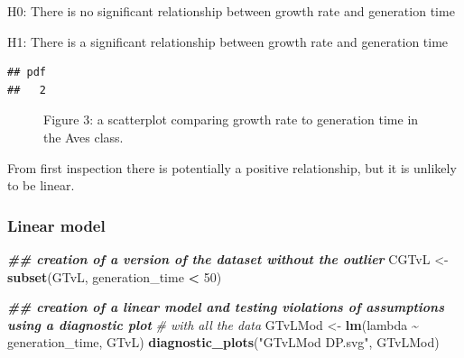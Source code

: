 \documentclass[
]{article}
\newenvironment{Shaded}{\begin{snugshade}}{\end{snugshade}}
\newcommand{\CommentTok}[1]{\textcolor[rgb]{0.56,0.35,0.01}{\textit{#1}}}
\newcommand{\ConstantTok}[1]{\textcolor[rgb]{0.56,0.35,0.01}{#1}}
\newcommand{\DecValTok}[1]{\textcolor[rgb]{0.00,0.00,0.81}{#1}}
\newcommand{\DocumentationTok}[1]{\textcolor[rgb]{0.56,0.35,0.01}{\textbf{\textit{#1}}}}
\newcommand{\FunctionTok}[1]{\textcolor[rgb]{0.13,0.29,0.53}{\textbf{#1}}}
\newcommand{\NormalTok}[1]{#1}
\newcommand{\OtherTok}[1]{\textcolor[rgb]{0.56,0.35,0.01}{#1}}
\newcommand{\SpecialCharTok}[1]{\textcolor[rgb]{0.81,0.36,0.00}{\textbf{#1}}}
\newcommand{\StringTok}[1]{\textcolor[rgb]{0.31,0.60,0.02}{#1}}
\begin{document}
H0: There is no significant relationship between growth rate and
generation time

H1: There is a significant relationship between growth rate and
generation time

\begin{Shaded}
\end{Shaded}

\begin{verbatim}
## pdf 
##   2
\end{verbatim}

\begin{figure}
\centering

\caption{Figure 3: a scatterplot comparing growth rate to generation
time in the Aves class.}
\end{figure}

From first inspection there is potentially a positive relationship, but
it is unlikely to be linear.

\subsubsection{\texorpdfstring{\textbf{Linear
model}}{Linear model}}\label{linear-model}

\begin{Shaded}
\begin{Highlighting}[]
\DocumentationTok{\#\# creation of a version of the dataset without the outlier}
\NormalTok{CGTvL }\OtherTok{\textless{}{-}} \FunctionTok{subset}\NormalTok{(GTvL, generation\_time }\SpecialCharTok{\textless{}} \DecValTok{50}\NormalTok{)}

\DocumentationTok{\#\# creation of a linear model and testing violations of assumptions using a diagnostic plot}
\CommentTok{\# with all the data}
\NormalTok{GTvLMod }\OtherTok{\textless{}{-}} \FunctionTok{lm}\NormalTok{(lambda }\SpecialCharTok{\textasciitilde{}}\NormalTok{ generation\_time, GTvL)}
\FunctionTok{diagnostic\_plots}\NormalTok{(}\StringTok{"GTvLMod DP.svg"}\NormalTok{, GTvLMod)}
\end{Highlighting}
\end{Shaded}
\end{document}
